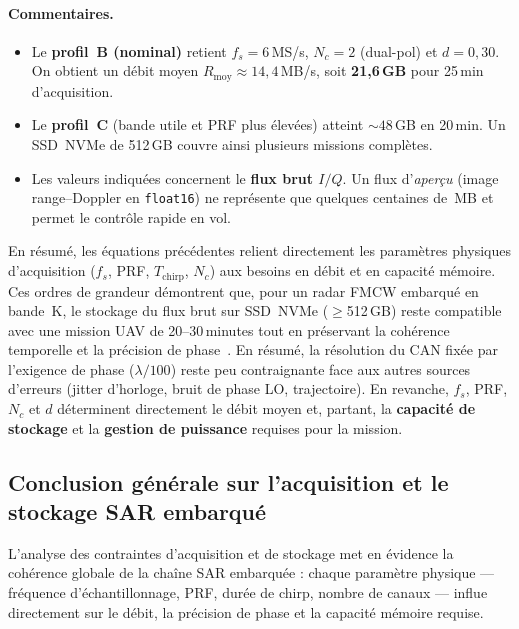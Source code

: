 \paragraph{Commentaires.}
\begin{itemize}
  \item Le \textbf{profil~B (nominal)} retient $f_s=6$\,MS/s, $N_c=2$ (dual-pol) et $d=0{,}30$. On obtient un débit moyen $R_{\mathrm{moy}}\approx14{,}4$\,MB/s, soit \textbf{21{,}6\,GB} pour 25\,min d’acquisition.
  \item Le \textbf{profil~C} (bande utile et PRF plus élevées) atteint $\sim48$\,GB en 20\,min. Un SSD~NVMe de 512\,GB couvre ainsi plusieurs missions complètes.
  \item Les valeurs indiquées concernent le \textbf{flux brut $I/Q$}. Un flux d’\emph{aperçu} (image range–Doppler en \texttt{float16}) ne représente que quelques centaines de~MB et permet le contrôle rapide en vol.
\end{itemize}

\vspace{0.5em}
En résumé, les équations précédentes relient directement les paramètres physiques d’acquisition ($f_s$, PRF, $T_{\mathrm{chirp}}$, $N_c$) aux besoins en débit et en capacité mémoire. Ces ordres de grandeur démontrent que, pour un radar FMCW embarqué en bande~K, le stockage du flux brut sur SSD~NVMe ($\geq$512\,GB) reste compatible avec une mission UAV de 20–30\,minutes tout en préservant la cohérence temporelle et la précision de phase~\cite{Aguasca2013_ARBRES_UAV_SAR,cumming2005,richards2010}.
En résumé, la résolution du CAN fixée par l’exigence de phase ($\lambda/100$) reste peu contraignante face aux autres sources d’erreurs (jitter d’horloge, bruit de phase LO, trajectoire). En revanche, $f_s$, PRF, $N_c$ et $d$ déterminent directement le débit moyen et, partant, la \textbf{capacité de stockage} et la \textbf{gestion de puissance} requises pour la mission.


\subsection*{Conclusion générale sur l'acquisition et le stockage SAR embarqué}

L’analyse des contraintes d’acquisition et de stockage met en évidence la cohérence globale de la chaîne SAR embarquée : chaque paramètre physique — fréquence d’échantillonnage, PRF, durée de chirp, nombre de canaux — influe directement sur le débit, la précision de phase et la capacité mémoire requise.

